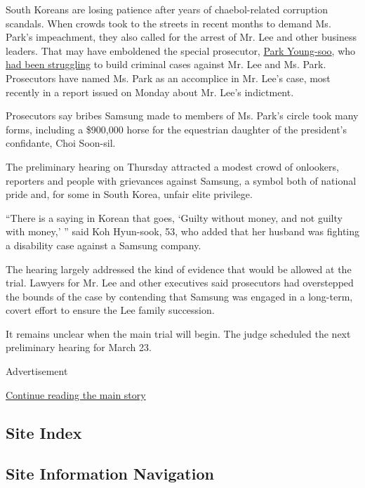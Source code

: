 South Koreans are losing patience after years of chaebol-related
corruption scandals. When crowds took to the streets in recent months to
demand Ms. Park's impeachment, they also called for the arrest of Mr.
Lee and other business leaders. That may have emboldened the special
prosecutor,
\href{https://www.nytimes.com/2017/03/06/world/asia/president-park-geun-hye-bribery-korea.html}{Park
Young-soo}, who
\href{https://www.nytimes.com/2017/01/18/world/asia/samsung-korea-president-impeachment.html}{had
been struggling} to build criminal cases against Mr. Lee and Ms. Park.
Prosecutors have named Ms. Park as an accomplice in Mr. Lee's case, most
recently in a report issued on Monday about Mr. Lee's indictment.

Prosecutors say bribes Samsung made to members of Ms. Park's circle took
many forms, including a \$900,000 horse for the equestrian daughter of
the president's confidante, Choi Soon-sil.

The preliminary hearing on Thursday attracted a modest crowd of
onlookers, reporters and people with grievances against Samsung, a
symbol both of national pride and, for some in South Korea, unfair elite
privilege.

``There is a saying in Korean that goes, `Guilty without money, and not
guilty with money,' '' said Koh Hyun-sook, 53, who added that her
husband was fighting a disability case against a Samsung company.

The hearing largely addressed the kind of evidence that would be allowed
at the trial. Lawyers for Mr. Lee and other executives said prosecutors
had overstepped the bounds of the case by contending that Samsung was
engaged in a long-term, covert effort to ensure the Lee family
succession.

It remains unclear when the main trial will begin. The judge scheduled
the next preliminary hearing for March 23.

Advertisement

\protect\hyperlink{after-bottom}{Continue reading the main story}

\hypertarget{site-index}{%
\subsection{Site Index}\label{site-index}}

\hypertarget{site-information-navigation}{%
\subsection{Site Information
Navigation}\label{site-information-navigation}}

